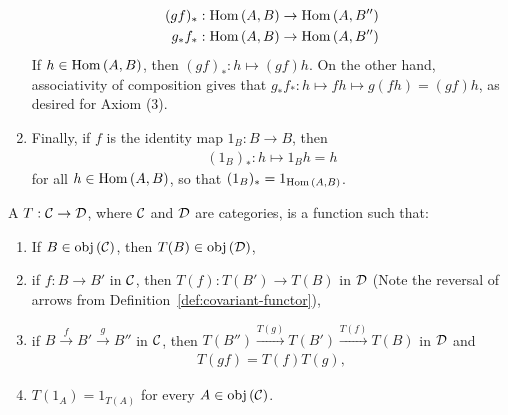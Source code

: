 \begin{example}
\begin{enumerate}[label = (\roman*)]
                    \begin{equation*}
                    \begin{split}
                        (gf)_\ast:\operatorname{Hom}{(A,B)} \rightarrow \operatorname{Hom}{(A,B'')}\\
                        g_\ast f_\ast:\operatorname{Hom}{(A,B)} \rightarrow \operatorname{Hom}{(A,B'')}
                    \end{split}
                    \end{equation*}
                If $h \in \operatorname{Hom}{(A,B)}$, then $(gf)_\ast:h \mapsto (gf)h$. On the other hand, associativity of composition gives that $g_\ast f_\ast : h \mapsto fh \mapsto g(fh) = (gf)h$, as desired for Axiom (3).

                \item Finally, if $f$ is the identity map $1_B : B \rightarrow B$, then
                    \begin{equation*}
                    \begin{split}
                        (1_B)_\ast : h \mapsto 1_B h = h
                    \end{split}
                    \end{equation*}
                for all $h \in \operatorname{Hom}{(A,B)}$, so that $(1_B)_\ast = 1_{\operatorname{Hom}{(A,B)}}$.
            \end{enumerate}
    \end{example}

    \begin{definition}
        A  $T: \mathcal{C} \rightarrow \mathcal{D}$, where $\mathcal{C}$ and $\mathcal{D}$ are categories, is a function such that:
            \begin{enumerate}[label = (\arabic*)]
                \item If $B \in \operatorname{obj}{(\mathcal{C})}$, then $T(B) \in \operatorname{obj}{(\mathcal{D})}$,
                \item if $f: B \rightarrow B'$ in $\mathcal{C}$, then $T(f): T(B') \rightarrow T(B)$ in $\mathcal{D}$ (Note the reversal of arrows from Definition~\ref{def:covariant-functor}),
                \item if $B \xrightarrow{f} B' \xrightarrow{g} B''$ in $\mathcal{C}$, then $T(B'') \xrightarrow{T(g)} T(B') \xrightarrow{T(f)} T(B)$ in $\mathcal{D}$ and 
                    \begin{equation*}
                    \begin{split}
                        T(gf) = T(f)T(g),
                    \end{split}
                    \end{equation*}
                \item $T(1_A) = 1_{T(A)}$ for every $A \in \operatorname{obj}{(\mathcal{C})}$.
            \end{enumerate}
    \end{definition}


